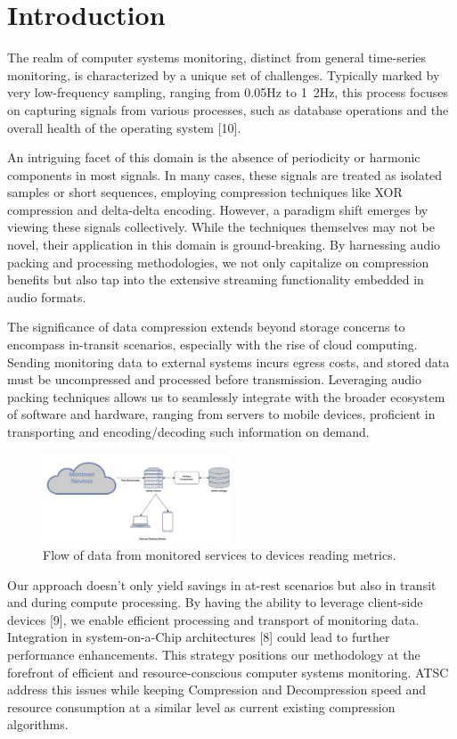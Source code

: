 \documentclass[conference]{IEEEtran}
\begin{document}
\section{Introduction}
The realm of computer systems monitoring, distinct from general time-series monitoring, is characterized by a unique set of challenges. Typically marked by very low-frequency sampling, ranging from 0.05Hz to 1~2Hz, this process focuses on capturing signals from various processes, such as database operations and the overall health of the operating system [10]. 
 
An intriguing facet of this domain is the absence of periodicity or harmonic components in most signals. In many cases, these signals are treated as isolated samples or short sequences, employing compression techniques like XOR compression and delta-delta encoding. 
However, a paradigm shift emerges by viewing these signals collectively. While the techniques themselves may not be novel, their application in this domain is ground-breaking. By harnessing audio packing and processing methodologies, we not only capitalize on compression benefits but also tap into the extensive streaming functionality embedded in audio formats. 
 
The significance of data compression extends beyond storage concerns to encompass in-transit scenarios, especially with the rise of cloud computing. Sending monitoring data to external systems incurs egress costs, and stored data must be uncompressed and processed before transmission. Leveraging audio packing techniques allows us to seamlessly integrate with the broader ecosystem of software and hardware, ranging from servers to mobile devices, proficient in transporting and encoding/decoding such information on demand. 

\begin{figure}[h]
  \centering
  \includegraphics[width=0.5\textwidth]{Fig1.png}
  \caption{Flow of data from monitored services to devices reading metrics.}
  \label{Fig.1}
\end{figure}

Our approach doesn't only yield savings in at-rest scenarios but also in transit and during compute processing. By having the ability to leverage client-side devices [9], we enable efficient processing and transport of monitoring data. Integration in system-on-a-Chip architectures [8] could lead to further performance enhancements. This strategy positions our methodology at the forefront of efficient and resource-conscious computer systems monitoring. ATSC address this issues while keeping Compression and Decompression speed and resource consumption at a similar level as current existing compression algorithms.
\end{document}

